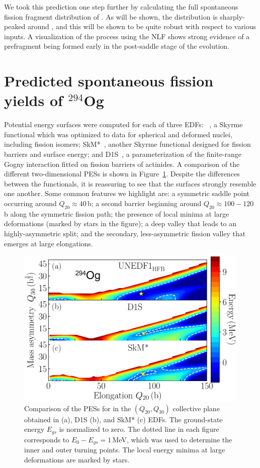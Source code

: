 We took this prediction one step further by calculating the full spontaneous fission fragment distribution of {\Og}. As will be shown, the distribution is sharply-peaked around {\Pb}, and this will be shown to be quite robust with respect to various inputs. A visualization of the process using the NLF shows strong evidence of a {\Pb} prefragment being formed early in the post-saddle stage of the evolution.

\section{Predicted spontaneous fission yields of $^{294}$Og}

Potential energy surfaces were computed for each of three EDFs: \hfb~\cite{Schunck2015}, a Skyrme functional which was optimized to data for spherical and deformed nuclei, including fission isomers; SkM*~\cite{Bartel1982}, another Skyrme functional designed for fission barriers and surface energy; and D1S~\cite{Berger1989}, a parameterization of the finite-range Gogny interaction fitted on fission barriers of actinides. A comparison of the different two-dimensional PESs is shown in Figure~\ref{fig:294ogthreepes}. Despite the differences between the functionals, it is reassuring to see that the surfaces strongly resemble one another. Some common features we highlight are: a symmetric saddle point occurring around $Q_{20}\approx 40$\,b; a second barrier beginning around $Q_{20}\approx100-120$\,b along the symmetric fission path; the presence of local minima at large deformations (marked by stars in the figure); a deep valley that leads to an highly-asymmetric split; and the secondary, less-asymmetric fission valley that emerges at large elongations.


\begin{figure}
	\centering
	\includegraphics[width=0.7\linewidth]{TeX_files/294Og_three_PES}
	\caption[PES comparison for $^{294}$Og using EDFs {\hfb}, D1S, and SkM*.]{Comparison of the PESs for \Og{} in the $(Q_{20},Q_{30})$ collective plane obtained in \hfb{} (a), D1S (b), and SkM* (c) EDFs. The ground-state energy $E_{gs}$ is normalized to zero. The dotted line in each figure corresponds to $E_0-E_{gs}=1$\,MeV, which was used to determine the inner and outer turning points. The local energy minima at large deformations are marked by stars.}
	\label{fig:294ogthreepes}
\end{figure}

